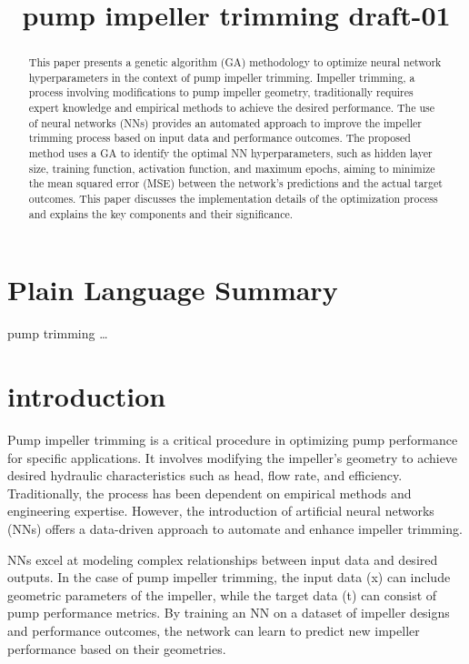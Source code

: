 \documentclass[
]{agujournal2019}
\begin{document}
\title{pump impeller trimming draft-01}



\begin{abstract}
This paper presents a genetic algorithm (GA) methodology to optimize
neural network hyperparameters in the context of pump impeller trimming.
Impeller trimming, a process involving modifications to pump impeller
geometry, traditionally requires expert knowledge and empirical methods
to achieve the desired performance. The use of neural networks (NNs)
provides an automated approach to improve the impeller trimming process
based on input data and performance outcomes. The proposed method uses a
GA to identify the optimal NN hyperparameters, such as hidden layer
size, training function, activation function, and maximum epochs, aiming
to minimize the mean squared error (MSE) between the network's
predictions and the actual target outcomes. This paper discusses the
implementation details of the optimization process and explains the key
components and their significance.
\end{abstract}

\section*{Plain Language Summary}
pump trimming \ldots{}



\section{introduction}\label{introduction}

Pump impeller trimming is a critical procedure in optimizing pump
performance for specific applications. It involves modifying the
impeller's geometry to achieve desired hydraulic characteristics such as
head, flow rate, and efficiency. Traditionally, the process has been
dependent on empirical methods and engineering expertise. However, the
introduction of artificial neural networks (NNs) offers a data-driven
approach to automate and enhance impeller trimming.

NNs excel at modeling complex relationships between input data and
desired outputs. In the case of pump impeller trimming, the input data
(x) can include geometric parameters of the impeller, while the target
data (t) can consist of pump performance metrics. By training an NN on a
dataset of impeller designs and performance outcomes, the network can
learn to predict new impeller performance based on their geometries.
\end{document}
